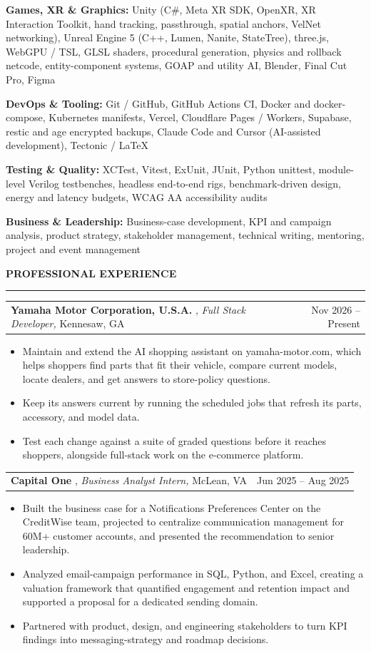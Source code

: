 \documentclass[letterpaper,10pt]{article}
\makeatletter
\newcommand{\SectionGapBefore}{12pt}
\newcommand{\SectionGapAfter}{4pt}
\newcommand{\EntryGapAfter}{2pt}
\newcommand{\IfEmpty}[3]{\if\relax\detokenize{#1}\relax#2\else#3\fi}
\newcommand{\sectiontitle}[1]{%
  \Needspace*{5\baselineskip}%
  \vspace{\SectionGapBefore}%
  {\textbf{\large #1}}\par
  \vspace{-6pt}%
  \rule{\textwidth}{0.4pt}\par
  \vspace{\SectionGapAfter}%
}
\newcommand{\experienceheading}[4]{%
  \Needspace*{3\baselineskip}%
  \begin{tabularx}{\textwidth}{@{}X r@{}}%
    \textbf{#1}%
    \IfEmpty{#2}{}{, \textit{#2\IfEmpty{#3}{}{,}}}%
    \IfEmpty{#3}{}{ #3}%
    & #4 \\%
  \end{tabularx}\par
  \nopagebreak\vspace{\EntryGapAfter}%
}
\newcommand{\skillrow}[2]{\textbf{#1:} #2\par\vspace{2pt}}
\makeatother
\begin{document}
\skillrow{Games, XR \& Graphics}{Unity (C\#, Meta XR SDK, OpenXR, XR Interaction Toolkit, hand tracking, passthrough, spatial anchors, VelNet networking), Unreal Engine 5 (C++, Lumen, Nanite, StateTree), three.js, WebGPU / TSL, GLSL shaders, procedural generation, physics and rollback netcode, entity-component systems, GOAP and utility AI, Blender, Final Cut Pro, Figma}
\skillrow{DevOps \& Tooling}{Git / GitHub, GitHub Actions CI, Docker and docker-compose, Kubernetes manifests, Vercel, Cloudflare Pages / Workers, Supabase, restic and age encrypted backups, Claude Code and Cursor (AI-assisted development), Tectonic / LaTeX}
\skillrow{Testing \& Quality}{XCTest, Vitest, ExUnit, JUnit, Python unittest, module-level Verilog testbenches, headless end-to-end rigs, benchmark-driven design, energy and latency budgets, WCAG AA accessibility audits}
\skillrow{Business \& Leadership}{Business-case development, KPI and campaign analysis, product strategy, stakeholder management, technical writing, mentoring, project and event management}

\sectiontitle{PROFESSIONAL EXPERIENCE}
\experienceheading{Yamaha Motor Corporation, U.S.A.}{Full Stack Developer}{Kennesaw, GA}{Nov 2026 -- Present}
\begin{itemize}
\item Maintain and extend the AI shopping assistant on yamaha-motor.com, which helps shoppers find parts that fit their vehicle, compare current models, locate dealers, and get answers to store-policy questions.
\item Keep its answers current by running the scheduled jobs that refresh its parts, accessory, and model data.
\item Test each change against a suite of graded questions before it reaches shoppers, alongside full-stack work on the e-commerce platform.
\end{itemize}

\experienceheading{Capital One}{Business Analyst Intern}{McLean, VA}{Jun 2025 -- Aug 2025}
\begin{itemize}
\item Built the business case for a Notifications Preferences Center on the CreditWise team, projected to centralize communication management for 60M+ customer accounts, and presented the recommendation to senior leadership.
\item Analyzed email-campaign performance in SQL, Python, and Excel, creating a valuation framework that quantified engagement and retention impact and supported a proposal for a dedicated sending domain.
\item Partnered with product, design, and engineering stakeholders to turn KPI findings into messaging-strategy and roadmap decisions.
\end{itemize}
\end{document}
